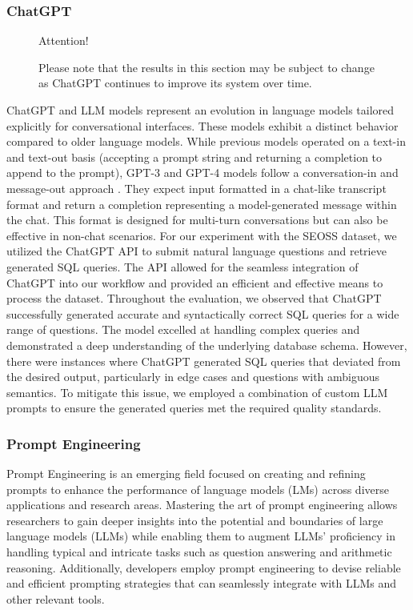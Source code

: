 \subsubsection{ChatGPT}

\begin{figure}[H]
    \begin{AIbox}{Attention!}
        \parbox{1\textwidth}{
            Please note that the results in this section may be subject to change as ChatGPT continues to improve its system over time.
        }
    \end{AIbox}
\end{figure}


ChatGPT and \ac{LLM} models represent an evolution in language models tailored explicitly for conversational interfaces. These models exhibit a distinct behavior compared to older language models. While previous models operated on a text-in and text-out basis (accepting a prompt string and returning a completion to append to the prompt), GPT-3 and GPT-4 models follow a conversation-in and message-out approach \cite{bubeck2023sparks}. They expect input formatted in a chat-like transcript format and return a completion representing a model-generated message within the chat. This format is designed for multi-turn conversations but can also be effective in non-chat scenarios.
For our experiment with the SEOSS dataset, we utilized the ChatGPT API to submit natural language questions and retrieve generated SQL queries. The API allowed for the seamless integration of ChatGPT into our workflow and provided an efficient and effective means to process the dataset.
Throughout the evaluation, we observed that ChatGPT successfully generated accurate and syntactically correct SQL queries for a wide range of questions. The model excelled at handling complex queries and demonstrated a deep understanding of the underlying database schema.
However, there were instances where ChatGPT generated SQL queries that deviated from the desired output, particularly in edge cases and questions with ambiguous semantics. To mitigate this issue, we employed a combination of custom LLM prompts to ensure the generated queries met the required quality standards.

\subsubsection{Prompt Engineering}

Prompt Engineering is an emerging field focused on creating and refining prompts to enhance the performance of language models (LMs) across diverse applications and research areas. Mastering the art of prompt engineering allows researchers to gain deeper insights into the potential and boundaries of large language models (LLMs) while enabling them to augment LLMs' proficiency in handling typical and intricate tasks such as question answering and arithmetic reasoning. Additionally, developers employ prompt engineering to devise reliable and efficient prompting strategies that can seamlessly integrate with LLMs and other relevant tools. \cite{Saravia_Prompt_Engineering_Guide_2022}

